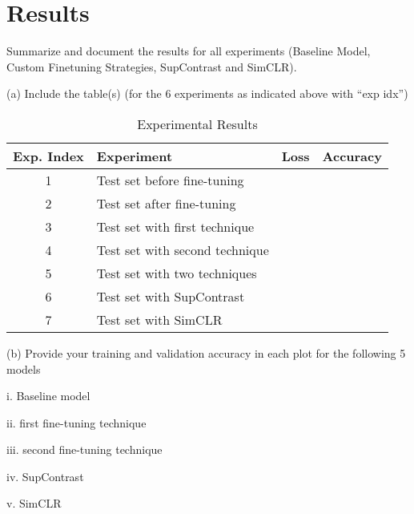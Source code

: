 \section*{Results}

Summarize and document the results for all experiments (Baseline Model, Custom Finetuning Strategies, SupContrast and SimCLR).

(a) Include the table(s) (for the 6 experiments as indicated above with “exp idx”)

\begin{table}[H]
    \centering
    \begin{tabular}{|c|l|l|l|}
        \hline
        Exp. Index & Experiment & Loss & Accuracy \\
        \hline
        1 & Test set before fine-tuning    && \\
        \hline
        2 & Test set after fine-tuning     && \\
        \hline
        3 & Test set with first technique  && \\
        \hline
        4 & Test set with second technique && \\
        \hline
        5 & Test set with two techniques   && \\
        \hline
        6 & Test set with SupContrast      && \\
        \hline
        7 & Test set with SimCLR           && \\
        \hline
    \end{tabular}
    \vspace{2mm}
    \caption{Experimental Results}
    \label{tab:exp}
\end{table}

(b) Provide your training and validation accuracy in each plot for the following 5 models

i. Baseline model

ii. first fine-tuning technique

iii. second fine-tuning technique 

iv. SupContrast

v. SimCLR
